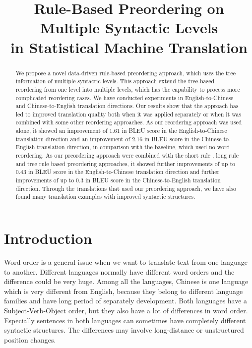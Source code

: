 \documentclass[a4paper]{article}
\title{Rule-Based Preordering on
Multiple Syntactic Levels \\in Statistical Machine Translation}
\begin{document}
\maketitle
%
\begin{abstract}
We propose a novel data-driven rule-based preordering approach, which uses the tree information of multiple syntactic levels. This approach extend the tree-based reordering from one level into multiple levels, which has the capability to process more complicated reordering cases. We have conducted experiments in English-to-Chinese and Chinese-to-English translation directions. Our results show that the approach has led to improved translation quality both when it was applied separately or when it was combined with some other reordering approaches. As our reordering approach was used alone, it showed an improvement of $1.61$ in BLEU score in the English-to-Chinese translation direction and an improvement of $2.16$ in BLEU score in the Chinese-to-English translation direction, in comparison with the baseline, which used no word reordering. As our preordering approach were combined with the short rule \cite{short}, long rule \cite{long} and tree rule \cite{tree} based preordering approaches, it showed further improvements of up to $0.43$ in BLEU score in the English-to-Chinese translation direction and further improvements of up to $0.3$ in BLEU score in the Chinese-to-English translation direction. Through the translations that used our preordering approach, we have also found many translation examples with improved syntactic structures.

 

\end{abstract}
%
\section{Introduction}
\label{in}

Word order is a general issue when we want to translate text from one language to another. Different languages normally have different word orders and the difference could be very huge. Among all the languages, Chinese is one language which is very different from English, because they belong to different language families and have long period of separately development. Both languages have a Subject-Verb-Object order, but they also have a lot of differences in word order. Especially sentences in both languages can sometimes have completely different syntactic structures. The differences may involve long-distance or unstructured position changes.
\end{document}
